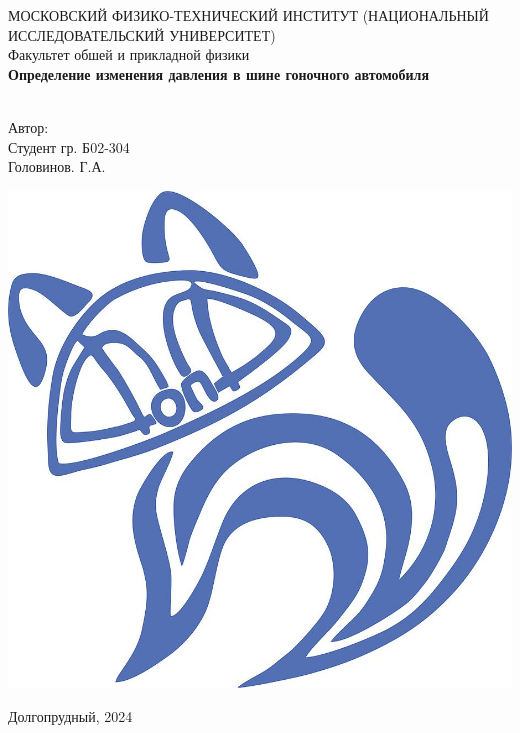 \begin{titlepage}
	\begin{center}
		МОСКОВСКИЙ ФИЗИКО-ТЕХНИЧЕСКИЙ ИНСТИТУТ (НАЦИОНАЛЬНЫЙ ИССЛЕДОВАТЕЛЬСКИЙ УНИВЕРСИТЕТ) \\
		
		
		\hfill \break
		Факультет обшей и прикладной физики\\
		\vspace{2.5cm}
		\LARGE{\textbf{Определение изменения давления в шине гоночного автомобиля}}\\
		\hfill \break
		\\
	\end{center}
	
	\begin{flushright}
		Автор:\\
		Студент гр. Б02-304\\
		Головинов. Г.А.
	\end{flushright}
	
	\vfill
	
	\begin{center}
		\includegraphics[width=0.15\linewidth]{uni}
	\end{center}
	
	\begin{center} Долгопрудный, 2024 \end{center}
	
	\thispagestyle{empty}
	
\end{titlepage}